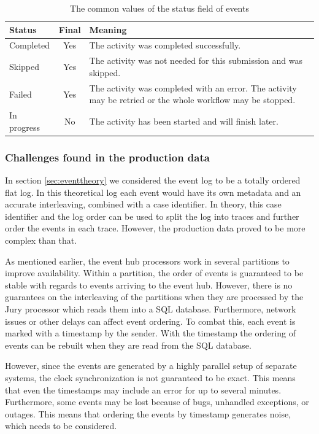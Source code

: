 \begin{table}[htb]
\begin{center}
\begin{tabularx}{\linewidth}{| l | c | X | }
\hline
\textbf{Status} & \textbf{Final} & \textbf{Meaning} \\
\hline
Completed   & Yes & The activity was completed successfully. \\
\hline
Skipped     & Yes & The activity was not needed for this submission and was skipped. \\
\hline
Failed      & Yes & The activity was completed with an error. The activity may be retried or the whole workflow may be stopped. \\
\hline
In progress & No  & The activity has been started and will finish later. \\
\hline
\end{tabularx}
\end{center}
\caption{The common values of the status field of events}
\label{tab:statuses}
\end{table}

\subsubsection{Challenges found in the production data}
\label{sec:datachallenges}

In section \ref{sec:eventtheory} we considered the event log to be a totally ordered flat log. In this theoretical log each event would have its own metadata and an accurate interleaving, combined with a case identifier.
In theory, this case identifier and the log order can be used to split the log into traces and further order the events in each trace.
However, the production data proved to be more complex than that. 

As mentioned earlier, the event hub processors work in several partitions to improve availability.
Within a partition, the order of events is guaranteed to be stable with regards to events arriving to the event hub. However, there is no guarantees on the interleaving of the partitions when they are processed by the Jury processor which reads them into a SQL database. 
Furthermore, network issues or other delays can affect event ordering. To combat this, each event is marked with a timestamp by the sender. With the timestamp the ordering of events can be rebuilt when they are read from the SQL database.

However, since the events are generated by a highly parallel setup of separate systems, the clock synchronization is not guaranteed to be exact. This means that even the timestamps may include an error for up to several minutes.
Furthermore, some events may be lost because of bugs, unhandled exceptions, or outages.
This means that ordering the events by timestamp generates noise, which needs to be considered.

